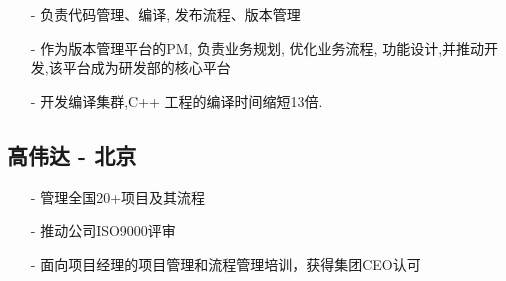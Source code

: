 \documentclass[11pt,a4paper]{moderncv}
\begin{document}
\vspace{1ex}  
\vspace*{0.2\baselineskip}
{
  \begin{itemize}
    \item[-]负责代码管理、编译, 发布流程、版本管理
	\vspace{1ex}  
    \item[-]作为版本管理平台的PM, 负责业务规划, 优化业务流程, 功能设计,并推动开发,该平台成为研发部的核心平台 
\vspace{1ex}  
    \item[-]开发编译集群,C++ 工程的编译时间缩短13倍.
  \end{itemize}
}

\vspace{2ex}  
\subsection{高伟达 - 北京}  
{
\begin{itemize}
    \item[-] 管理全国20+项目及其流程
	\vspace{1ex}  
    \item[-] 推动公司ISO9000评审
	\vspace{1ex}  
    \item[-] 面向项目经理的项目管理和流程管理培训，获得集团CEO认可
  \end{itemize}
}


\end{document}
